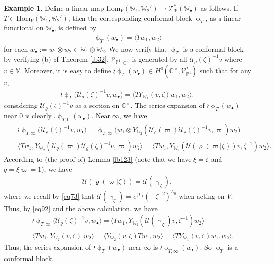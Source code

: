 \documentclass[12pt,b5paper,notitlepage]{report}
\theoremstyle{definition}
\newtheorem{eg}[df]{Example}
\theoremstyle{plain}
\newcommand{\fk}{\mathfrak}
\newcommand{\mc}{\mathcal}
\newcommand{\tr}{\mathrm{t}} %
\newcommand{\Hom}{\mathrm{Hom}}
\newcommand{\bk}[1]{\langle {#1}\rangle}
\newcommand{\scr}{\mathscr}
\newcommand{\blt}{\bullet}
\newcommand{\Vbb}{\mathbb V}
\newcommand{\Wbb}{\mathbb W}
\newcommand{\Cbb}{\mathbb C}
\newcommand{\Pbb}{\mathbb P}
\numberwithin{equation}{section}
\begin{document}
\begin{eg}
Define a linear map $\Hom_V(\Wbb_1,\Wbb_2')\rightarrow\scr T_{\fk X}^*(\Wbb_\blt)$ as follows. If $T\in \Hom_V(\Wbb_1,\Wbb_2')$, then the corresponding conformal block $\upphi_T$, as a linear functional on $\Wbb_\blt$, is defined by
\begin{align}
\upphi_T(w_\blt)=\bk{Tw_1,w_2}
\end{align}
for each $w_\blt:=w_1\otimes w_2\in \Wbb_1\otimes \Wbb_2$. We now verify that $\upphi_T$ is a conformal block by verifying (b) of Theorem \ref{lb32}. $\scr V_{\Pbb^1}|_{\Cbb^\times}$ is  generated by all $\mc U_\varrho(\zeta)^{-1}v$ where $v\in\Vbb$. Moreover, it is easy to define $\wr\upphi_T(w_\blt)\in H^0(\Cbb^\times,\scr V_{\Pbb^1}^*)$ such that for any $v$,
\begin{align*}
\wr\upphi_T\big(\mc U_\varrho(\zeta)^{-1}v,w_\blt\big)=\bk{TY_{\Wbb_1}(v,\zeta)w_1,w_2},
\end{align*}
considering $\mc U_\varrho(\zeta)^{-1}v$ as a section on $\Cbb^\times$. The series expansion of $\wr\upphi_T(w_\blt)$ near $0$ is clearly $\wr\upphi_{T,0}(w_\blt)$. Near $\infty$, we have
\begin{align*}
&\wr\upphi_{T,\infty}\big(\mc U_\varrho(\zeta)^{-1}v,w_\blt\big)=\upphi_{T,\infty}\big(w_1\otimes Y_{\Wbb_2}(\mc U_\varrho(\varpi)\mc U_\varrho(\zeta)^{-1}v,\varpi) w_2\big)\\
=&\bk{Tw_1,Y_{\Wbb_2}(\mc U_\varrho(\varpi)\mc U_\varrho(\zeta)^{-1}v,\varpi) w_2}=\bk{Tw_1,Y_{\Wbb_2}(\mc U(\varrho(\varpi|\zeta))v,\zeta^{-1}) w_2}.
\end{align*}
According to (the proof of) Lemma \ref{lb123} (note that we have $\xi=\zeta$ and $q=\xi\varpi=1$), we have
\begin{align*}
\mc U(\varrho(\varpi|\zeta))=\mc U(\upgamma_\zeta),
\end{align*}
where we recall by \eqref{eq73} that $\mc U(\upgamma_\zeta)=e^{\zeta L_1}(-\zeta^{-2})^{L_0}$ when acting on $V$. Thus, by \eqref{eq92} and the above calculation, we have
\begin{align*}
&\wr\upphi_{T,\infty}\big(\mc U_\varrho(\zeta)^{-1}v,w_\blt\big)=\bk{Tw_1,Y_{\Wbb_2}(\mc U(\upgamma_\zeta)v,\zeta^{-1}) w_2}\\
=&\bk{Tw_1,Y_{\Wbb_2}(v,\zeta)^\tr w_2}=\bk{Y_{\Wbb_2}(v,\zeta)Tw_1, w_2}=\bk{TY_{\Wbb_1}(v,\zeta)w_1,w_2}.
\end{align*}
Thus, the series expansion of $\wr\upphi_T(w_\blt)$ near $\infty$ is $\wr\upphi_{T,\infty}(w_\blt)$. So $\upphi_T$ is a conformal block.


\end{eg}
\end{document}
